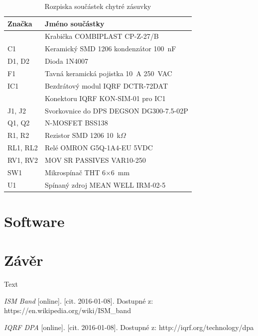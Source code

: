 \documentclass[12pt,a4paper,oneside]{article}
\begin{document}
\begin{table}[H]
	\centering
	\begin{tabular}{|l|l|}
		\hline 
		\textbf{Značka} & \textbf{Jméno součástky} \\ 
		\hline 
		\hline 
		~ & Krabička COMBIPLAST CP-Z-27/B \\ 
		\hline 
		C1 & Keramický SMD 1206 kondenzátor 100~nF \\ 
		\hline 
		D1, D2 & Dioda 1N4007 \\ 
		\hline 
		F1 & Tavná keramická pojistka 10~A 250~VAC \\ 
		\hline 
		IC1 & Bezdrátový modul IQRF DCTR-72DAT \\ 
		\hline 
		~ & Konektoru IQRF KON-SIM-01 pro IC1 \\ 
		\hline 
		J1, J2 & Svorkovnice do DPS DEGSON DG300-7.5-02P \\ 
		\hline 
		Q1, Q2 & N-MOSFET BSS138 \\ 
		\hline 
		R1, R2 & Rezistor SMD 1206 10~k$\Omega$ \\ 
		\hline 
		RL1, RL2 & Relé OMRON G5Q-1A4-EU 5VDC \\ 
		\hline 
		RV1, RV2 & MOV SR PASSIVES VAR10-250 \\ 
		\hline 
		SW1 & Mikrospínač THT 6$\times$6~mm \\ 
		\hline 
		U1 & Spínaný zdroj MEAN WELL IRM-02-5 \\ 
		\hline 
	\end{tabular}
	\caption{Rozpiska součástek chytré zásuvky}\label{table:rozpiska-soucastek}
\end{table}

\section{Software}

\newpage

\section*{Závěr}


Text

\newpage

\appendix

\begin{thebibliography}{99}

\emph{ISM Band} [online]. [cit. 2016-01-08]. Dostupné z: https://en.wikipedia.org/wiki/ISM\_band

\emph{IQRF DPA} [online]. [cit. 2016-01-08]. Dostupné z: http://iqrf.org/technology/dpa

\end{thebibliography}

\newpage

\listoffigures

\listoftables
\end{document}
